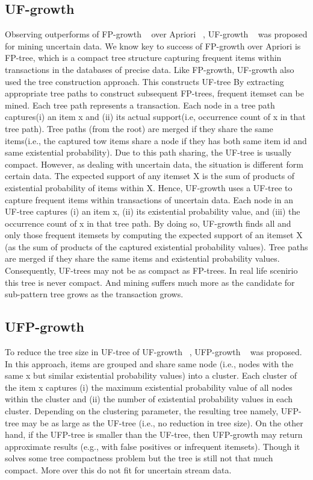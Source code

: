 	\subsection{UF-growth}
	Observing outperforms of FP-growth ~\cite{fp_growth} over Apriori ~\cite{apriori}, UF-growth ~\cite{uf_growth} was proposed for mining uncertain data. We know key to success of FP-growth over Apriori is FP-tree, which is a compact tree structure capturing frequent items within transactions in the databases of precise data. Like FP-growth, UF-growth also used the tree construction approach. This constructs UF-tree By extracting appropriate tree paths to construct subsequent FP-trees, frequent itemset can be mined. Each tree path represents a transaction. Each node in a tree path captures(i) an item x and (ii) its actual support(i.e, occurrence count of x in that tree path). Tree paths (from the root) are merged if they share the same items(i.e., the captured tow items share a node if they has both same item id and same existential probability). Due to this path sharing, the UF-tree is usually compact. However, as dealing with uncertain data, the situation is different form certain data. The expected support of any itemset X is the sum of products of existential probability of items within X. Hence, UF-growth uses a UF-tree to capture frequent items within transactions of uncertain data. Each node in an UF-tree captures (i) an item x, (ii) its existential probability value, and (iii) the occurrence count of x in that tree path. By doing so, UF-growth ﬁnds all and only those frequent itemsets by computing the expected support of an itemset X (as the sum of products of the captured existential probability values). Tree paths are merged if they share the same items and existential probability values. Consequently, UF-trees may not be as compact as FP-trees. In real life scenirio this tree is never compact. And mining suffers much more as the candidate for sub-pattern tree grows as the transaction grows.
	
	\subsection{UFP-growth}
	To reduce the tree size in UF-tree of UF-growth ~\cite{uf_growth}, UFP-growth ~\cite{ufp_growth} was proposed. In this approach, items are grouped and share same node (i.e., nodes with the same x but similar existential probability values) into a cluster. Each cluster of the item x captures (i) the maximum existential probability value of all nodes within the cluster and (ii) the number of existential probability values in each cluster. Depending on the clustering parameter, the resulting tree namely, UFP-tree may be as large as the UF-tree (i.e., no reduction in tree size). On the other hand, if the UFP-tree  is smaller than the UF-tree, then UFP-growth may return approximate results (e.g., with false positives or infrequent itemsets). Though it solves some tree compactness problem but the tree is still not that much compact. More over this do not fit for uncertain stream data. 
	
